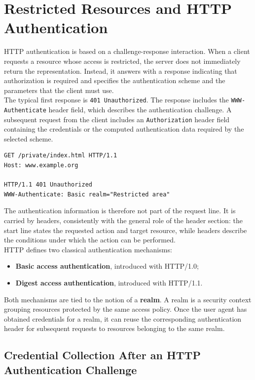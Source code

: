 \documentclass{scrbook}
\begin{document}
\section{Restricted Resources and HTTP Authentication}

HTTP authentication is based on a challenge-response interaction. When a client requests a resource whose access is restricted, the server does not immediately return the representation. Instead, it answers with a response indicating that authorization is required and specifies the authentication scheme and the parameters that the client must use.\\

The typical first response is \texttt{401 Unauthorized}. The response includes the \texttt{WWW-Authenticate} header field, which describes the authentication challenge. A subsequent request from the client includes an \texttt{Authorization} header field containing the credentials or the computed authentication data required by the selected scheme.

\begin{lstlisting}
GET /private/index.html HTTP/1.1
Host: www.example.org

HTTP/1.1 401 Unauthorized
WWW-Authenticate: Basic realm="Restricted area"
\end{lstlisting}

The authentication information is therefore not part of the request line. It is carried by headers, consistently with the general role of the header section: the start line states the requested action and target resource, while headers describe the conditions under which the action can be performed.\\

HTTP defines two classical authentication mechanisms:
\begin{itemize}
    \item \textbf{Basic access authentication}, introduced with HTTP/1.0;
    \item \textbf{Digest access authentication}, introduced with HTTP/1.1.
\end{itemize}

Both mechanisms are tied to the notion of a \textbf{realm}. A realm is a security context grouping resources protected by the same access policy. Once the user agent has obtained credentials for a realm, it can reuse the corresponding authentication header for subsequent requests to resources belonging to the same realm.

\subsection{Credential Collection After an HTTP Authentication Challenge}
\end{document}
